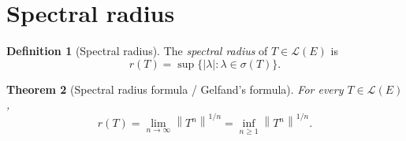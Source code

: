 \documentclass[a4paper,12pt]{book}
\newcommand{\norm}[1]{\left\| #1 \right\|}
\newcommand{\abs}[1]{\left| #1 \right|}
\theoremstyle{definition}
\newtheorem{definition}{Definition}[chapter]
\theoremstyle{plain}
\newtheorem{theorem}[definition]{Theorem}
\theoremstyle{remark}
\begin{document}
\section{Spectral radius}\label{sec:spectral-radius}

\begin{definition}[Spectral radius]\label{def:spectral-radius}
The \emph{spectral radius} of $T\in\mathcal{L}(E)$ is
\[
  r(T) = \sup\bigl\{\abs{\lambda} : \lambda\in\sigma(T)\bigr\}.
\]
\end{definition}

\begin{theorem}[Spectral radius formula / Gelfand's formula]
\label{thm:spectral-radius}
For every $T\in\mathcal{L}(E)$,
\[
  r(T) = \lim_{n\to\infty}\norm{T^n}^{1/n} = \inf_{n\geq 1}\norm{T^n}^{1/n}.
\]
\end{theorem}
\end{document}
